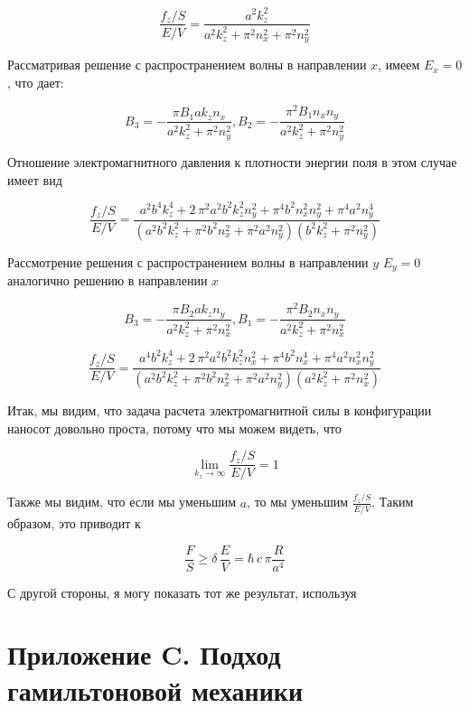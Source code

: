 \documentclass[11pt]{article}
\begin{document}
\[\frac{f_z/S}{E/V} = \frac{a^{2} k_{z}^{2}}{a^{2} k_{z}^{2} + \pi^{2} n_{x}^{2} + \pi^{2} n_{y}^{2}}\]

    Рассматривая решение с распространением волны в направлении \(x\), имеем
\(E_x = 0\), что дает:

\[B_3 = -\frac{\pi B_{1} a k_{z} n_{x}}{a^{2} k_{z}^{2} + \pi^{2} n_{y}^{2}}, 
B_2 = -\frac{\pi^{2} B_{1} n_{x} n_{y}}{a^{2} k_{z}^{2} + \pi^{2} n_{y}^{2}}\]

Отношение электромагнитного давления к плотности энергии поля в этом
случае имеет вид

\[\frac{f_z/S}{E/V} = \frac{a^{2} b^{4} k_{z}^{4} + 2 \, \pi^{2} a^{2} b^{2} k_{z}^{2} n_{y}^{2} + \pi^{4} b^{2} n_{x}^{2} n_{y}^{2} + \pi^{4} a^{2} n_{y}^{4}}{{\left(a^{2} b^{2} k_{z}^{2} + \pi^{2} b^{2} n_{x}^{2} + \pi^{2} a^{2} n_{y}^{2}\right)} {\left(b^{2} k_{z}^{2} + \pi^{2} n_{y}^{2}\right)}}\]

Рассмотрение решения с распространением волны в направлении \(y\)
\(E_y = 0\) аналогично решению в направлении \(x\)

    \[B_3 = -\frac{\pi B_{2} a k_{z} n_{y}}{a^{2} k_{z}^{2} + \pi^{2} n_{x}^{2}}, 
B_1 = -\frac{\pi^{2} B_{2} n_{x} n_{y}}{a^{2} k_{z}^{2} + \pi^{2} n_{x}^{2}}\]

\[\frac{f_z/S}{E/V} = \frac{a^{4} b^{2} k_{z}^{4} + 2 \, \pi^{2} a^{2} b^{2} k_{z}^{2} n_{x}^{2} + \pi^{4} b^{2} n_{x}^{4} + \pi^{4} a^{2} n_{x}^{2} n_{y}^{2}}{{\left(a^{2} b^{2} k_{z}^{2} + \pi^{2} b^{2} n_{x}^{2} + \pi^{2} a^{2} n_{y}^{2}\right)} {\left(a^{2} k_{z}^{2} + \pi^{2} n_{x}^{2}\right)}}\]

    Итак, мы видим, что задача расчета электромагнитной силы в конфигурации
наносот довольно проста, потому что мы можем видеть, что

\[\lim_{k_z \to \infty}\frac{f_z/S}{E/V} = 1\]

Также мы видим, что если мы уменьшим \(a\), то мы уменьшим
\(\frac{f_z/S}{E/V}\). Таким образом, это приводит к

\[\frac{F}{S} \geq \delta\,\frac{E}{V} = \hbar\,c\, \pi\frac{R}{a^4}\]

С другой стороны, я могу показать тот же результат, используя

    \section{Приложение C. Подход гамильтоновой
механики}\label{ux43fux440ux438ux43bux43eux436ux435ux43dux438ux435-c.-ux43fux43eux434ux445ux43eux434-ux433ux430ux43cux438ux43bux44cux442ux43eux43dux43eux432ux43eux439-ux43cux435ux445ux430ux43dux438ux43aux438}
\end{document}
